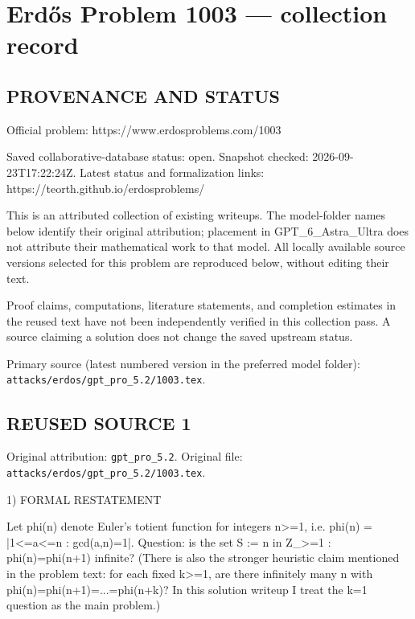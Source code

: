 \section*{Erd\H{o}s Problem 1003 --- collection record}

\subsection*{PROVENANCE AND STATUS}
Official problem: https://www.erdosproblems.com/1003

Saved collaborative-database status: open.
Snapshot checked: 2026-09-23T17:22:24Z.
Latest status and formalization links: https://teorth.github.io/erdosproblems/

This is an attributed collection of existing writeups. The model-folder names below identify their original attribution; placement in GPT\_6\_Astra\_Ultra does not attribute their mathematical work to that model. All locally available source versions selected for this problem are reproduced below, without editing their text.

Proof claims, computations, literature statements, and completion estimates in the reused text have not been independently verified in this collection pass. A source claiming a solution does not change the saved upstream status.

Primary source (latest numbered version in the preferred model folder): \texttt{attacks/erdos/gpt\_pro\_5.2/1003.tex}.

\subsection*{REUSED SOURCE 1}
Original attribution: \texttt{gpt\_pro\_5.2}.
Original file: \texttt{attacks/erdos/gpt\_pro\_5.2/1003.tex}.


1) FORMAL RESTATEMENT

Let phi(n) denote Euler's totient function for integers n>=1, i.e.
phi(n) = |{1<=a<=n : gcd(a,n)=1}|.
Question: is the set
  S := { n in Z_{>=1} : phi(n)=phi(n+1) }
infinite?
(There is also the stronger heuristic claim mentioned in the problem text: for each fixed k>=1, are there infinitely many n with phi(n)=phi(n+1)=...=phi(n+k)? In this solution writeup I treat the k=1 question as the main problem.)

